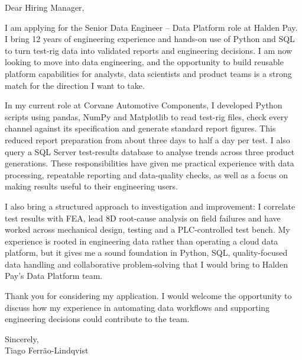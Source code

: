 \documentclass[11pt,a4paper]{article}
\begin{document}
Dear Hiring Manager,

I am applying for the Senior Data Engineer -- Data Platform role at Halden Pay. I bring 12 years of engineering experience and hands-on use of Python and SQL to turn test-rig data into validated reports and engineering decisions. I am now looking to move into data engineering, and the opportunity to build reusable platform capabilities for analysts, data scientists and product teams is a strong match for the direction I want to take.

In my current role at Corvane Automotive Components, I developed Python scripts using pandas, NumPy and Matplotlib to read test-rig files, check every channel against its specification and generate standard report figures. This reduced report preparation from about three days to half a day per test. I also query a SQL Server test-results database to analyse trends across three product generations. These responsibilities have given me practical experience with data processing, repeatable reporting and data-quality checks, as well as a focus on making results useful to their engineering users.

I also bring a structured approach to investigation and improvement: I correlate test results with FEA, lead 8D root-cause analysis on field failures and have worked across mechanical design, testing and a PLC-controlled test bench. My experience is rooted in engineering data rather than operating a cloud data platform, but it gives me a sound foundation in Python, SQL, quality-focused data handling and collaborative problem-solving that I would bring to Halden Pay’s Data Platform team.

Thank you for considering my application. I would welcome the opportunity to discuss how my experience in automating data workflows and supporting engineering decisions could contribute to the team.

Sincerely,\\
Tiago Ferrão-Lindqvist
\end{document}

